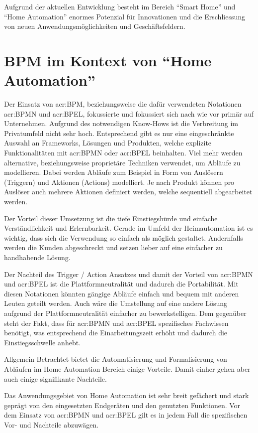 Aufgrund der aktuellen Entwicklung besteht im Bereich "`Smart Home"' und "`Home Automation"' enormes Potenzial für Innovationen und die Erschliessung von neuen Anwendungsmöglichkeiten und Geschäftsfeldern. 

\section{BPM im Kontext von "`Home Automation"'}\label{sec:Analyse:HA:Kontext}
Der Einsatz von \gls{acr:BPM}, beziehungsweise die dafür verwendeten Notationen \gls{acr:BPMN} und \gls{acr:BPEL}, fokussierte und fokussiert sich nach wie vor primär auf Unternehmen. Aufgrund des notwendigen Know-Hows ist die Verbreitung im Privatumfeld nicht sehr hoch. Entsprechend gibt es nur eine eingeschränkte Auswahl an Frameworks, Lösungen und Produkten, welche explizite Funktionalitäten mit \gls{acr:BPMN} oder \gls{acr:BPEL} beinhalten. Viel mehr werden alternative, beziehungsweise proprietäre Techniken verwendet, um Abläufe zu modellieren. Dabei werden Abläufe zum Beispiel in Form von Auslösern (Triggern) und Aktionen (Actions) modelliert. Je nach Produkt können pro Auslöser auch mehrere Aktionen definiert werden, welche sequentiell abgearbeitet werden.

Der Vorteil dieser Umsetzung ist die tiefe Einstiegshürde und einfache Verständlichkeit und Erlernbarkeit. Gerade im Umfeld der Heimautomation ist es wichtig, dass sich die Verwendung so einfach als möglich gestaltet. Andernfalls werden die Kunden abgeschreckt und setzen lieber auf eine einfacher zu handhabende Lösung.

Der Nachteil des Trigger / Action Ansatzes und damit der Vorteil von \gls{acr:BPMN} und \gls{acr:BPEL} ist die Plattformneutralität und dadurch die Portabilität. Mit diesen Notationen könnten gängige Abläufe einfach und bequem mit anderen Leuten geteilt werden. Auch wäre die Umstellung auf eine andere Lösung aufgrund der Plattformneutralität einfacher zu bewerkstelligen. Dem gegenüber steht der Fakt, dass für \gls{acr:BPMN} und \gls{acr:BPEL} spezifisches Fachwissen benötigt, was entsprechend die Einarbeitungszeit erhöht und dadurch die Einstiegsschwelle anhebt.

Allgemein Betrachtet bietet die Automatisierung und Formalisierung von Abläufen im Home Automation Bereich einige Vorteile. Damit einher gehen aber auch einige signifikante Nachteile.

Das Anwendungsgebiet von Home Automation ist sehr breit gefächert und stark geprägt von den eingesetzten Endgeräten und den genutzten Funktionen. Vor dem Einsatz von \gls{acr:BPMN} und \gls{acr:BPEL} gilt es in jedem Fall die spezifischen Vor- und Nachteile abzuwägen. 



